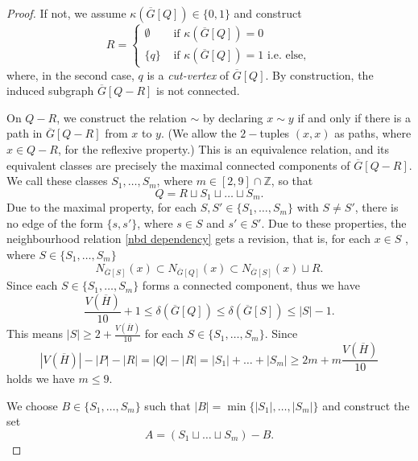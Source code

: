 \documentclass[10pt,a4paper]{amsart}
\begin{document}
\begin{proof}
If not, we assume $\kappa(\overline{G}[Q])\in\{0,1\}$ and 
construct	
\begin{equation*}
	R=\begin{cases}
		\emptyset &\text{ if } \kappa(\overline{G}[Q])=0\\
		\{q\}&\text{ if } \kappa(\overline{G}[Q])=1\text{ i.e. else},
	\end{cases}
\end{equation*}	
where, in the second case, $q$ is a \emph{cut-vertex} of $\overline{G}[Q]$. By construction, the induced subgraph  $\overline{G}[Q-R]$ is not connected.  

On $Q-R$, we construct the relation $\sim$ by declaring $x\sim y$ if and only if there is a path in $\overline{G}[Q-R]$ from 
$x$ to $y$. (We allow the  $2-$tuples $(x,x)$ as paths, where $x\in Q-R$, for the reflexive property.) This is an equivalence relation, and its equivalent classes are precisely the maximal connected components of $\overline{G}[Q-R]$. We call these classes $S_{1},\ldots,S_{m}$, where $m\in[2,9]\cap\mathbb{Z}$, so that 
\begin{equation*}
Q=R\sqcup S_{1}\sqcup\ldots\sqcup S_{m}.
\end{equation*}
Due to the maximal property, for each  $S,S'\in\{S_{1},\ldots,S_{m}\}$ with $S\neq S'$, there is no edge of the form $\{s,s'\}$, where $s\in S$ and $s'\in S'$. Due to these properties, the neighbourhood relation \eqref{nbd dependency} gets a revision, that is, for each $x\in S$ , where $S\in\{S_{1},\ldots,S_{m}\}$
\begin{equation*}
 N_{\overline{G}[S]}(x)\subset N_{\overline{G}[Q]}(x)\subset N_{\overline{G}[S]}(x)\sqcup R.    
\end{equation*}
Since each $S\in\{S_{1},\ldots,S_{m}\}$ forms a connected component, thus we have 
\begin{equation*}
 \frac{V(\overline{H})}{10}+1\leq\delta(\overline{G}[Q])\leq\delta(\overline{G}[S])\leq|S|-1.   
\end{equation*}
This means $|S|\geq2+\frac{V(\overline{H})}{10}$ for each $S\in\{S_{1},\ldots,S_{m}\}$. Since 
\begin{equation*}
|V(\overline{H})|-|P|-|R|=|Q|-|R|=|S_{1}|+\ldots+|S_{m}|\geq2m+m\frac{V(\overline{H})}{10}    
\end{equation*}
holds we have $m\leq9$. 

We choose $B\in\{S_{1},\ldots,S_{m}\}$ such that $|B|=\min\{|S_{1}|,\ldots,|S_{m}|\}$ and construct the set 
\begin{equation*}
 A=(S_{1}\sqcup\ldots\sqcup S_{m})-B.   
\end{equation*}


\end{proof}
\end{document}
